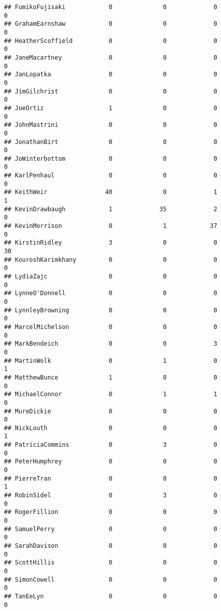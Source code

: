 \documentclass[
  12pt,
]{article}
\begin{document}
\begin{verbatim}
## FumikoFujisaki            0              0             0             0
## GrahamEarnshaw            0              0             0             0
## HeatherScoffield          0              0             0             0
## JaneMacartney             0              0             0             0
## JanLopatka                0              0             0             0
## JimGilchrist              0              0             0             0
## JoeOrtiz                  1              0             0             0
## JohnMastrini              0              0             0             0
## JonathanBirt              0              0             0             0
## JoWinterbottom            0              0             0             0
## KarlPenhaul               0              0             0             0
## KeithWeir                40              0             1             1
## KevinDrawbaugh            1             35             2             0
## KevinMorrison             0              1            37             0
## KirstinRidley             3              0             0            30
## KouroshKarimkhany         0              0             0             0
## LydiaZajc                 0              0             0             0
## LynneO'Donnell            0              0             0             0
## LynnleyBrowning           0              0             0             0
## MarcelMichelson           0              0             0             0
## MarkBendeich              0              0             3             0
## MartinWolk                0              1             0             1
## MatthewBunce              1              0             0             0
## MichaelConnor             0              1             1             0
## MureDickie                0              0             0             0
## NickLouth                 0              0             0             1
## PatriciaCommins           0              3             0             0
## PeterHumphrey             0              0             0             0
## PierreTran                0              0             0             1
## RobinSidel                0              3             0             0
## RogerFillion              0              0             0             0
## SamuelPerry               0              0             0             0
## SarahDavison              0              0             0             0
## ScottHillis               0              0             0             0
## SimonCowell               0              0             0             0
## TanEeLyn                  0              0             0             0

\end{verbatim}
\end{document}
